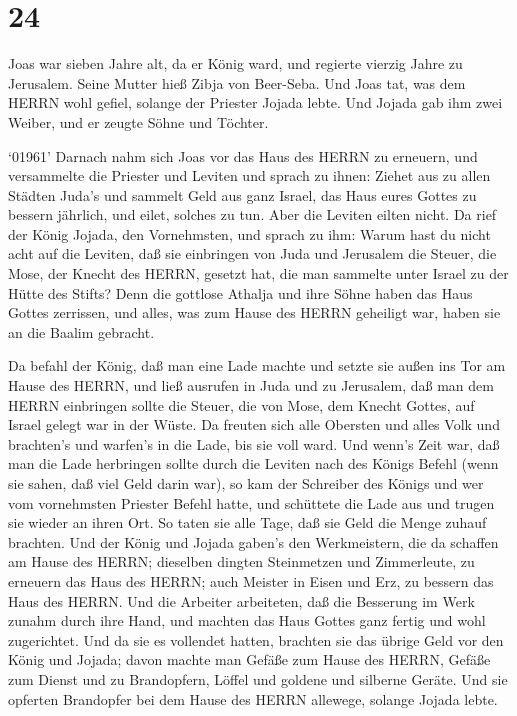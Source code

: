 \hypertarget{section-23}{%
\section{24}\label{section-23}}

 Joas war sieben Jahre alt, da er König ward, und regierte
vierzig Jahre zu Jerusalem. Seine Mutter hieß Zibja von Beer-Seba.
 Und Joas tat, was dem HERRN wohl gefiel, solange der
Priester Jojada lebte.  Und Jojada gab ihm zwei Weiber, und
er zeugte Söhne und Töchter.

 `01961' Darnach nahm sich Joas vor das Haus des HERRN zu
erneuern,  und versammelte die Priester und Leviten und
sprach zu ihnen: Ziehet aus zu allen Städten Juda's und sammelt Geld aus
ganz Israel, das Haus eures Gottes zu bessern jährlich, und eilet,
solches zu tun. Aber die Leviten eilten nicht.  Da rief der
König Jojada, den Vornehmsten, und sprach zu ihm: Warum hast du nicht
acht auf die Leviten, daß sie einbringen von Juda und Jerusalem die
Steuer, die Mose, der Knecht des HERRN, gesetzt hat, die man sammelte
unter Israel zu der Hütte des Stifts?  Denn die gottlose
Athalja und ihre Söhne haben das Haus Gottes zerrissen, und alles, was
zum Hause des HERRN geheiligt war, haben sie an die Baalim gebracht.

 Da befahl der König, daß man eine Lade machte und setzte
sie außen ins Tor am Hause des HERRN,  und ließ ausrufen in
Juda und zu Jerusalem, daß man dem HERRN einbringen sollte die Steuer,
die von Mose, dem Knecht Gottes, auf Israel gelegt war in der Wüste.
 Da freuten sich alle Obersten und alles Volk und
brachten's und warfen's in die Lade, bis sie voll ward. 
Und wenn's Zeit war, daß man die Lade herbringen sollte durch die
Leviten nach des Königs Befehl (wenn sie sahen, daß viel Geld darin
war), so kam der Schreiber des Königs und wer vom vornehmsten Priester
Befehl hatte, und schüttete die Lade aus und trugen sie wieder an ihren
Ort. So taten sie alle Tage, daß sie Geld die Menge zuhauf brachten.
 Und der König und Jojada gaben's den Werkmeistern, die da
schaffen am Hause des HERRN; dieselben dingten Steinmetzen und
Zimmerleute, zu erneuern das Haus des HERRN; auch Meister in Eisen und
Erz, zu bessern das Haus des HERRN.  Und die Arbeiter
arbeiteten, daß die Besserung im Werk zunahm durch ihre Hand, und
machten das Haus Gottes ganz fertig und wohl zugerichtet. 
Und da sie es vollendet hatten, brachten sie das übrige Geld vor den
König und Jojada; davon machte man Gefäße zum Hause des HERRN, Gefäße
zum Dienst und zu Brandopfern, Löffel und goldene und silberne Geräte.
Und sie opferten Brandopfer bei dem Hause des HERRN allewege, solange
Jojada lebte.

